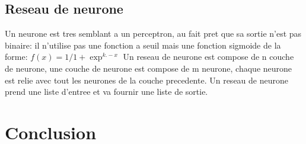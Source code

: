 \documentclass{article}
\begin{document}
\subsection{Reseau de neurone}
Un neurone est tres semblant a un perceptron, au fait pret que sa sortie n'est pas binaire: il n'utilise pas une fonction a seuil mais une fonction sigmoide de la forme: 
$f(x) = 1 / 1 + \exp ^{k.-x}$
Un reseau de neurone est compose de n couche de neurone, une couche de neurone est compose de m neurone, chaque neurone est relie avec tout les neurones de la couche precedente. Un reseau de neurone prend une liste d'entree et va fournir une liste de sortie.

\section{Conclusion}
\end{document}
